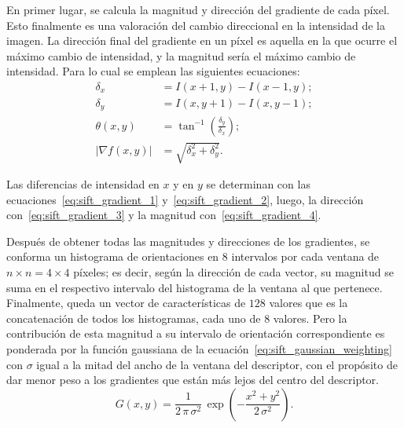 En primer lugar, se calcula la magnitud y dirección del gradiente de cada píxel.
Esto finalmente es una valoración del cambio direccional en la intensidad de la imagen.
La dirección final del gradiente en un píxel es aquella en la que ocurre el máximo cambio de intensidad, y la magnitud sería el máximo cambio de intensidad.
Para lo cual se emplean las siguientes ecuaciones:
%
\begin{subequations}
    \label{eq:sift_gradient}
    \begin{align}
        \delta_x &= I(x + 1, y) - I(x - 1, y); \label{eq:sift_gradient_1} \\
        \delta_y &= I(x, y + 1) - I(x, y - 1); \label{eq:sift_gradient_2} \\
        \theta(x,y) &= \tan^{-1}\left(\frac{\delta_y}{\delta_x}\right); \label{eq:sift_gradient_3} \\
        |\nabla f(x, y)| &= \sqrt{\delta_x^2 + \delta_y^2}. \label{eq:sift_gradient_4}
    \end{align}
\end{subequations}

Las diferencias de intensidad en $x$ y en $y$ se determinan con las ecuaciones~\eqref{eq:sift_gradient_1} y~\eqref{eq:sift_gradient_2}, luego, la dirección con~\eqref{eq:sift_gradient_3} y la magnitud con~\eqref{eq:sift_gradient_4}.

Después de obtener todas las magnitudes y direcciones de los gradientes, se conforma un histograma de orientaciones en $8$ intervalos por cada ventana de $n \times n = 4 \times 4$ píxeles;
es decir, según la dirección de cada vector, su magnitud se suma en el respectivo intervalo del histograma de la ventana al que pertenece.
Finalmente, queda un vector de características de $128$ valores que es la concatenación de todos los histogramas, cada uno de $8$ valores.
Pero la contribución de esta magnitud a su intervalo de orientación correspondiente es ponderada por la función gaussiana de la ecuación~\eqref{eq:sift_gaussian_weighting} con $\sigma$ igual a la mitad del ancho de la ventana del descriptor, con el propósito de dar menor peso a los gradientes que están más lejos del centro del descriptor.
%
\begin{equation}
    \label{eq:sift_gaussian_weighting}
    G(x,y) = \frac{1}{2\,\pi\,\sigma^2}\,\exp{\left(-\frac{x^2 + y^2}{2\,\sigma^2}\right)  }.
\end{equation}

